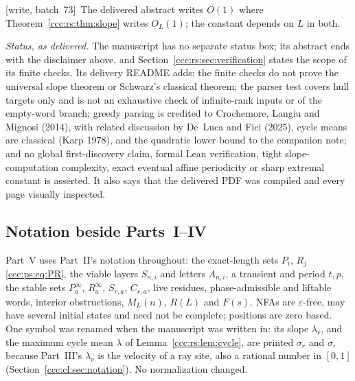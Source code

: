 \documentclass[11pt,letterpaper]{article}
\theoremstyle{definition}
\theoremstyle{remark}
\newcommand{\eps}{\varepsilon}
\newcommand{\wsevthree}{\textup{[write, batch~73]}}
\begin{document}
\wsevthree\ The delivered abstract writes $O(1)$ where
Theorem~\ref{ccc:rs:thm:slope} writes $O_L(1)$; the constant depends on $L$
in both.

\emph{Status, as delivered.} The manuscript has no separate status box; its
abstract ends with the disclaimer above, and
Section~\ref{ccc:rs:sec:verification} states the scope of its finite checks.
Its delivery README adds: the finite checks do not prove the universal slope
theorem or Schwarz's classical theorem; the parser test covers hull targets
only and is not an exhaustive check of infinite-rank inputs or of the
empty-word branch; greedy parsing is credited to Crochemore, Langiu and
Mignosi (2014), with related discussion by De~Luca and Fici (2025), cycle
means are classical (Karp 1978), and the quadratic lower bound to the
companion note; and no global first-discovery claim, formal Lean
verification, tight slope-computation complexity, exact eventual affine
periodicity or sharp extremal constant is asserted. It also says that the
delivered PDF was compiled and every page visually inspected.

\subsection{Notation beside Parts~I--IV}\label{ccc:rs:sec:notation}

Part~V uses Part~II's notation throughout: the exact-length sets $P_i$,
$R_j$ \eqref{ccc:ps:eq:PR}, the viable layers $S_{n,i}$ and letters
$A_{n,i}$, a transient and period $t,p$, the stable sets $P^\infty_a$,
$R^\infty_a$, $S_{r,a}$, $C_{r,a}$, live residues, phase-admissible and
liftable words, interior obstructions, $M_L(n)$, $R(L)$ and $F(s)$. NFAs are
$\eps$-free, may have several initial states and need not be complete;
positions are zero based. One symbol was renamed when the manuscript was
written in: its slope $\lambda_r$, and the maximum cycle mean $\lambda$ of
Lemma~\ref{ccc:rs:lem:cycle}, are printed $\sigma_r$ and $\sigma$, because
Part~III's $\lambda_v$ is the velocity of a ray site, also a rational number
in $[0,1]$ (Section~\ref{ccc:cl:sec:notation}). No normalization changed.
\end{document}

